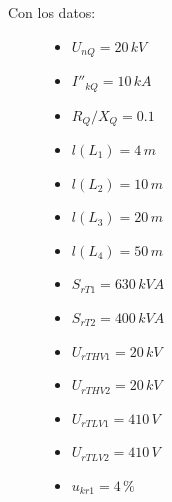             Con los datos:
            \begin{figure}[H]
                \begin{minipage}{0.2\textwidth}
                    \begin{itemize}
                        \item $U_\textit{nQ} = 20\,\textit{kV}$
                        \item $I''_\textit{kQ} = 10\,\textit{kA}$
                        \item $R_\textit{Q}/X_\textit{Q} = 0.1$
                        \item $l(L_1) = 4\,\textit{m}$
                        \item $l(L_2) = 10\,\textit{m}$
                        \item $l(L_3) = 20\,\textit{m}$
                    \end{itemize}
                \end{minipage}%
                \begin{minipage}{0.2\textwidth}
                    \begin{itemize}
                        \item $l(L_4) = 50\,\textit{m}$
                        \item $S_\textit{rT1} = 630\,\textit{kVA}$
                        \item $S_\textit{rT2} = 400\,\textit{kVA}$
                    \end{itemize}
                \end{minipage}%
                \begin{minipage}{0.2\textwidth}
                    \begin{itemize}
                        \item $U_\textit{rTHV1} = 20\,\textit{kV}$
                        \item $U_\textit{rTHV2} = 20\,\textit{kV}$
                        \item $U_\textit{rTLV1} = 410\,\textit{V}$
                    \end{itemize}
                \end{minipage}%
                \begin{minipage}{0.2\textwidth}
                    \begin{itemize}
                        \item $U_\textit{rTLV2} = 410\,\textit{V}$
                        \item $u_\textit{kr1} = 4\,\text{\%}$

\end{itemize}
\end{minipage}
\end{figure}
